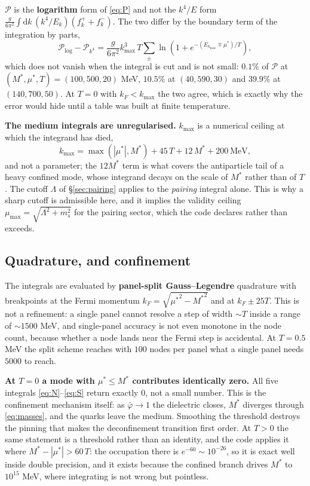 \documentclass[11pt,a4paper]{article}
\newcommand{\phib}{\bar\varphi}
\newcommand{\Mstar}{M^{*}}
\newcommand{\mustar}{\mu^{*}}
\begin{document}
$\mathcal P$ is the \textbf{logarithm} form of \eqref{eq:P} and not the
$k^4/E$ form
$\tfrac{g}{6\pi^2}\int\mathrm dk\,(k^4/E_k)(f^+_k+f^-_k)$. The two differ by
the boundary term of the integration by parts,
\begin{equation}
\mathcal P_{\log} - \mathcal P_{k^4}
 = \frac{g}{6\pi^2}k_{\max}^3\,T\sum_\pm
 \ln\left(1+e^{-(E_{k_{\max}}\mp\mustar)/T}\right),
\end{equation}
which does not vanish when the integral is cut and is not small: $0.1\%$ of
$\mathcal P$ at $(\Mstar,\mustar,T)=(100,500,20)$ MeV, $10.5\%$ at
$(40,590,30)$ and $39.9\%$ at $(140,700,50)$. At $T=0$ with $k_F<k_{\max}$ the
two agree, which is exactly why the error would hide until a table was built
at finite temperature.

\textbf{The medium integrals are unregularised.} $k_{\max}$ is a numerical
ceiling at which the integrand has died,
\begin{equation}
k_{\max}=\max(|\mustar|,\Mstar)+45\,T+12\,\Mstar+200\ \text{MeV},
\label{eq:kmax}
\end{equation}
and not a parameter; the $12\Mstar$ term is what covers the antiparticle tail
of a heavy confined mode, whose integrand decays on the scale of $\Mstar$
rather than of $T$. The cutoff $\Lambda$ of \S\ref{sec:pairing} applies to the
\emph{pairing} integral alone. This is why a sharp cutoff is admissible here,
and it implies the validity ceiling $\mu_{\max}=\sqrt{\Lambda^2+m_s^2}$ for the
pairing sector, which the code declares rather than exceeds.

\subsection{Quadrature, and confinement}

The integrals are evaluated by \textbf{panel-split Gauss--Legendre} quadrature
with breakpoints at the Fermi momentum $k_F=\sqrt{{\mustar}^2-{\Mstar}^2}$ and at
$k_F\pm 25T$. This is not a refinement: a single panel cannot resolve a step of
width $\sim T$ inside a range of $\sim1500$ MeV, and single-panel accuracy is
not even monotone in the node count, because whether a node lands near the
Fermi step is accidental. At $T=0.5$ MeV the split scheme reaches with $100$
nodes per panel what a single panel needs $5000$ to reach.

\textbf{At $T=0$ a mode with $\mustar\le\Mstar$ contributes identically zero.}
All five integrals \eqref{eq:N}--\eqref{eq:S} return exactly $0$, not a small
number. This is the confinement mechanism itself: as $\phib\to1$ the dielectric
closes, $\Mstar$ diverges through \eqref{eq:masses}, and the quarks leave the
medium. Smoothing the threshold destroys the pinning that makes the
deconfinement transition first order. At $T>0$ the same statement is a
threshold rather than an identity, and the code applies it where
$\Mstar-|\mustar| > 60\,T$: the occupation there is $e^{-60}\sim10^{-26}$, so
it is exact well inside double precision, and it exists because the confined
branch drives $\Mstar$ to $10^{15}$ MeV, where integrating is not wrong but
pointless.
\end{document}
